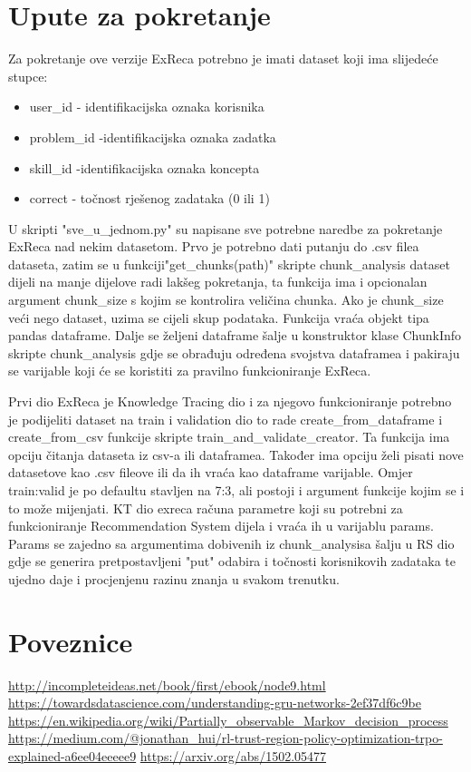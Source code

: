 \section{Upute za pokretanje}

Za pokretanje ove verzije ExReca potrebno je imati dataset koji ima slijedeće stupce:

\begin{itemize}
	 \item user\_id - identifikacijska oznaka korisnika
	 \item problem\_id -identifikacijska oznaka zadatka
	 \item skill\_id -identifikacijska oznaka koncepta
	 \item correct - točnost rješenog zadataka (0 ili 1)
\end{itemize}

U skripti "sve\_u\_jednom.py" su napisane sve potrebne naredbe za pokretanje ExReca nad nekim datasetom.
Prvo je potrebno dati putanju do .csv filea dataseta, zatim se u funkciji"get\_chunks(path)" skripte chunk\_analysis
dataset dijeli na manje dijelove radi lakšeg pokretanja, ta funkcija ima i opcionalan argument chunk\_size s
kojim se kontrolira veličina chunka. Ako je chunk\_size veći nego dataset, uzima se cijeli skup podataka. Funkcija
vraća objekt tipa pandas dataframe. Dalje se željeni dataframe šalje u konstruktor klase ChunkInfo skripte chunk\_analysis
gdje se obrađuju određena svojstva dataframea i pakiraju se varijable koji će se koristiti za pravilno funkcioniranje ExReca.

Prvi dio ExReca je Knowledge Tracing dio i za njegovo funkcioniranje potrebno je podijeliti dataset na train i validation dio
to rade create\_from\_dataframe i create\_from\_csv funkcije skripte train\_and\_validate\_creator. Ta funkcija ima opciju
čitanja dataseta iz csv-a ili dataframea. Također ima opciju želi pisati nove datasetove kao .csv fileove ili da ih vraća
kao dataframe varijable. Omjer train:valid je po defaultu stavljen na 7:3, ali postoji i argument funkcije kojim se i to može mijenjati.
KT dio exreca računa parametre koji su potrebni za funkcioniranje Recommendation System dijela i vraća ih u varijablu params.
Params se zajedno sa argumentima dobivenih iz chunk\_analysisa šalju u RS dio gdje se generira pretpostavljeni "put" odabira i
točnosti korisnikovih zadataka te ujedno daje i procjenjenu razinu znanja u svakom trenutku.

\section{Poveznice}
\url{http://incompleteideas.net/book/first/ebook/node9.html}
\url{https://towardsdatascience.com/understanding-gru-networks-2ef37df6c9be}
\url{https://en.wikipedia.org/wiki/Partially_observable_Markov_decision_process}
\url{https://medium.com/@jonathan_hui/rl-trust-region-policy-optimization-trpo-explained-a6ee04eeeee9}
\url{https://arxiv.org/abs/1502.05477}

